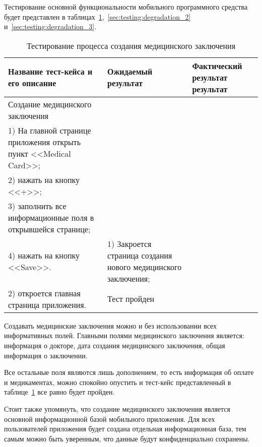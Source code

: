 Тестирование основной функциональности мобильного программного средства будет представлен в таблицах~\ref{sec:testing:degradation_1},~\ref{sec:testing:degradation_2} и~\ref{sec:testing:degradation_3}.

\begin{longtable}[p]{| >{\raggedright}p{}                     
                     | >{\raggedright}p{}
                     | >{\raggedright\arraybackslash}p{}|}
  \caption{Тестирование процесса создания медицинского заключения}
  \label{sec:testing:degradation_1} \tabularnewline

  \hline
      Название тест-кейса и его описание & Ожидаемый результат & Фактический результат результат \\
   \hline
   Создание медицинского заключения\\ 
   1) На главной странице приложения открыть пункт <<Medical Card>>; \\
   2) нажать на кнопку <<+>>;\\
   3) заполнить все информационные поля в открывшейся странице;\\
   4) нажать на кнопку <<Save>>.

   &
   1) Закроется страница создания нового медицинского заключения;\\
   2) откроется главная страница приложения.

   &
   Тест пройден \\
   \hline
\end{longtable}

Создавать медицинские заключения можно и без использовании всех информативных полей. Главными полями медицинского заключения является: информация о докторе, дата создания медицинского заключения, общая информация о заключении.

Все остальные поля являются лишь дополнением, то есть информация об оплате и медикаментах, можно спокойно опустить и тест-кейс представленный в таблице~\ref{sec:testing:degradation_1} все равно будет пройден.

Стоит также упомянуть, что создание медицинского заключения является основной информационной базой мобильного приложения. Для всех пользователей приложения будет создана отдельная информационная база, тем самым можно быть уверенным, что данные будут конфиденциально сохранены.

\pagebreak

